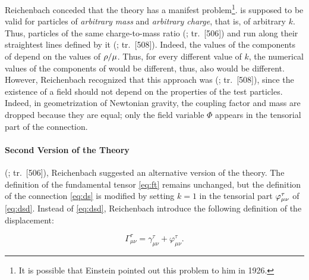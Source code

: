 \documentclass[submitted]{article}
\newcommand{\ctmr}{charge-to-mass ratio\xspace}
\newcommand{\ctmrd}{\ensuremath{\hfrac{\rho}{\mu}}\xspace}
\renewcommand{\rzlap}[2]{(\cite[#1]{Reichenbach1928}; tr.\ [#2])\xspace}
\begin{document}

Reichenbach conceded that the theory has a manifest problem\footnote{It is possible that Einstein pointed out this problem to him in 1926. }.  is supposed to be valid for particles of \emph{arbitrary mass} and \emph{arbitrary charge}, that is, of arbitrary $k$. Thus, particles of the same \ctmr {} \rzlap{362}{506} and run along their  straightest lines defined by it \rzlap{363}{508}. Indeed, the values of the components of \Gtmn depend on the values of \ctmrd. Thus, for every different value of $k$, the numerical values of the components of \Gtmn would be different, thus, also \ritea would be different. However, Reichenbach recognized that this approach was  \rzlap{363}{508}, since the existence of a field should not depend on the properties of the test particles. Indeed, in  geometrization of Newtonian gravity, the coupling factor and mass are dropped because they are equal; only the field variable $\Phi$ appears in the tensorial part of the connection.

\paragraph{Second Version of the Theory}
\label{RTt}

 \rzlap{367}{506}, Reichenbach suggested an alternative version of the theory. The definition of the fundamental tensor \cref{eq:ft} remains unchanged, but the definition of the connection \cref{eq:ds} is modified by setting $k=1$ in the tensorial part $\varphi^\tau_{\mu\nu}$ of \cref{eq:dsd}. Instead of \cref{eq:dsd}, Reichenbach introduce the following definition of the displacement:

\begin{equation*}
\Gamma_{\mu \nu}^{\tau}=\gamma_{\mu \nu}^{\tau}+\varphi_{\mu \nu}^{\tau}.
\end{equation*}
\end{document}
